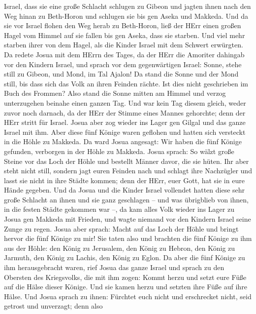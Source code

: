 Israel, dass sie eine große Schlacht schlugen zu Gibeon und jagten ihnen
nach den Weg hinan zu Beth-Horon und schlugen sie bis gen Aseka und
Makkeda.  Und da sie vor Israel flohen den Weg herab zu
Beth-Horon, ließ der HErr einen großen Hagel vom Himmel auf sie fallen
bis gen Aseka, dass sie starben. Und viel mehr starben ihrer von dem
Hagel, als die Kinder Israel mit dem Schwert erwürgten.  Da
redete Josua mit dem HErrn des Tages, da der HErr die Amoriter dahingab
vor den Kindern Israel, und sprach vor dem gegenwärtigen Israel: Sonne,
stehe still zu Gibeon, und Mond, im Tal Ajalon!  Da stand
die Sonne und der Mond still, bis dass sich das Volk an ihren Feinden
rächte. Ist dies nicht geschrieben im Buch des Frommen? Also stand die
Sonne mitten am Himmel und verzog unterzugehen beinahe einen ganzen Tag.
 Und war kein Tag diesem gleich, weder zuvor noch darnach,
da der HErr der Stimme eines Mannes gehorchte; denn der HErr stritt für
Israel.  Josua aber zog wieder ins Lager gen Gilgal und das
ganze Israel mit ihm.  Aber diese fünf Könige waren
geflohen und hatten sich versteckt in die Höhle zu Makkeda.
 Da ward Josua angesagt: Wir haben die fünf Könige
gefunden, verborgen in der Höhle zu Makkeda.  Josua sprach:
So wälzt große Steine vor das Loch der Höhle und bestellt Männer davor,
die sie hüten.  Ihr aber steht nicht still, sondern jagt
euren Feinden nach und schlagt ihre Nachzügler und lasst sie nicht in
ihre Städte kommen; denn der HErr, euer Gott, hat sie in eure Hände
gegeben.  Und da Josua und die Kinder Israel vollendet
hatten diese sehr große Schlacht an ihnen und sie ganz geschlagen -- und
was übrigblieb von ihnen, in die festen Städte gekommen war --,
 da kam alles Volk wieder ins Lager zu Josua gen Makkeda
mit Frieden, und wagte niemand vor den Kindern Israel seine Zunge zu
regen.  Josua aber sprach: Macht auf das Loch der Höhle und
bringt hervor die fünf Könige zu mir!  Sie taten also und
brachten die fünf Könige zu ihm aus der Höhle: den König zu Jerusalem,
den König zu Hebron, den König zu Jarmuth, den König zu Lachis, den
König zu Eglon.  Da aber die fünf Könige zu ihm
herausgebracht waren, rief Josua das ganze Israel und sprach zu den
Obersten des Kriegsvolks, die mit ihm zogen: Kommt herzu und setzt eure
Füße auf die Hälse dieser Könige. Und sie kamen herzu und setzten ihre
Füße auf ihre Hälse.  Und Josua sprach zu ihnen: Fürchtet
euch nicht und erschrecket nicht, seid getrost und unverzagt; denn also
